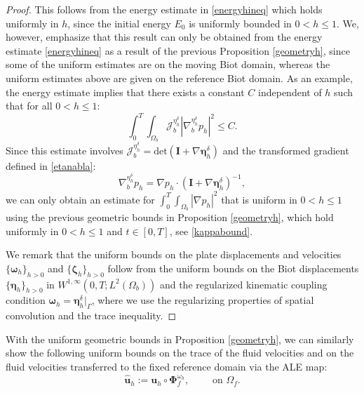 \documentclass[11pt]{article}
\newcommand{\bd}{\boldsymbol}
\theoremstyle{definition}
\begin{document}
\begin{proof}
This follows from the energy estimate in \eqref{energyhineq} which holds uniformly in $h$, since the initial energy $E_{0}$ is uniformly bounded in $0 < h \le 1$. We, however, emphasize that this result can only be obtained from the energy estimate \eqref{energyhineq} as a result of the previous Proposition \ref{geometryh}, since some of the uniform estimates are on the moving Biot domain, whereas the uniform estimates above are given on the reference Biot domain. As an example, the energy estimate implies that there exists a constant $C$ independent of $h$ such that for all $0 < h \le 1$:
\begin{equation*}
\int_{0}^{T} \int_{\Omega_{b}} \mathcal{J}^{\eta^{\delta}_{h}}_{b} \left|\nabla^{\eta^{\delta}_{h}}_{b} p_{h}\right|^{2} \le C.
\end{equation*}
Since this estimate involves $\mathcal{J}^{\eta^{\delta}_{h}}_{b} = \text{det}(\bd{I} + \nabla \bd{\eta}^{\delta}_{h})$ and the transformed gradient defined in \eqref{etanabla}:
\begin{equation*}
\nabla^{\eta^{\delta}_{h}}_{b} p_{h} = \nabla p_{h} \cdot (\bd{I} + \nabla \bd{\eta}^{\delta}_{h})^{-1},
\end{equation*}
we can only obtain an estimate for $\displaystyle \int_{0}^{T} \int_{\Omega_{b}} |\nabla p_{h}|^{2}$ that is uniform in $0 < h \le 1$ using the previous geometric bounds in Proposition \ref{geometryh}, which hold uniformly in $0 < h \le 1$ and $t \in [0, T]$, see \eqref{kappabound}.

We remark that the uniform bounds on the plate displacements and velocities $\{\bd{\omega}_{h}\}_{h > 0}$ and $\{\bd{\zeta}_{h}\}_{h > 0}$ follow from the uniform bounds on the Biot displacements $\{\bd{\eta}_{h}\}_{h > 0}$ in $W^{1, \infty}(0, T; L^{2}(\Omega_{b}))$ and the regularized kinematic coupling condition $\bd{\omega}_{h} = \bd{\eta}^{\delta}_{h}|_{\Gamma}$, where we use the regularizing properties of spatial convolution and the trace inequality. 
\end{proof}

With the uniform geometric bounds in Proposition \ref{geometryh}, we can similarly show the following uniform bounds on the trace of the fluid velocities and on the fluid velocities transferred to the fixed reference domain via the ALE map:
\begin{equation}\label{hatuh}
\hat{\bd{u}}_{h} := \bd{u}_{h} \circ \bd{\Phi}^{\omega_{h}}_{f}, \qquad \text{ on } \Omega_{f}.
\end{equation}
\end{document}
